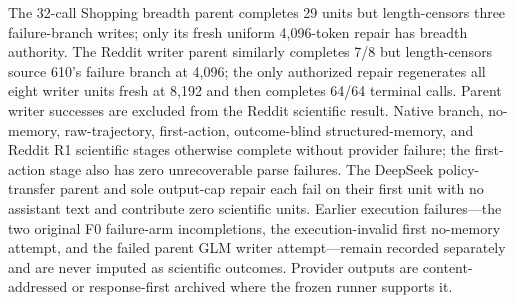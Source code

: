 The 32-call Shopping breadth parent completes 29 units but length-censors three failure-branch writes; only its fresh uniform 4,096-token repair has breadth authority. The Reddit writer parent similarly completes 7/8 but length-censors source 610's failure branch at 4,096; the only authorized repair regenerates all eight writer units fresh at 8,192 and then completes 64/64 terminal calls. Parent writer successes are excluded from the Reddit scientific result. Native branch, no-memory, raw-trajectory, first-action, outcome-blind structured-memory, and Reddit R1 scientific stages otherwise complete without provider failure; the first-action stage also has zero unrecoverable parse failures. The DeepSeek policy-transfer parent and sole output-cap repair each fail on their first unit with no assistant text and contribute zero scientific units. Earlier execution failures---the two original F0 failure-arm incompletions, the execution-invalid first no-memory attempt, and the failed parent GLM writer attempt---remain recorded separately and are never imputed as scientific outcomes. Provider outputs are content-addressed or response-first archived where the frozen runner supports it.
